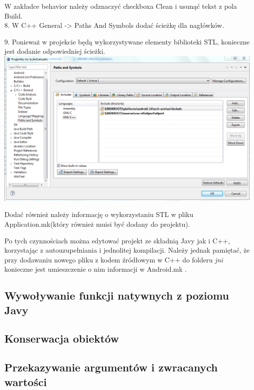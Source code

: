   W zakładce behavior należy odznaczyć checkboxa Clean i usunąć tekst z pola
  Build.\\
  8. W C++ General -> Paths And Symbols dodać ścieżkę dla nagłówków.
 
  9. Ponieważ w projekcie będą wykorzystywane elementy biblioteki STL, konieczne
  jest dodanie odpowiedniej ścieżki.\\
  
  \includegraphics[width=\textwidth]{./img/ndkroot.png}
  
  Dodać również należy informację o wykorzystaniu STL w pliku
  Application.mk(który również muisi być dodany do projektu).
  
  
  
  Po tych czynnościach można edytować projekt ze składnią Javy jak i C++,
  korzystając z autouzupełniania i jednolitej kompilacji. Należy jednak
  pamiętać, że przy dodawaniu nowego pliku z kodem źródłowym w C++ do folderu
  \emph{jni} konieczne jest umieszczenie o nim informacji w Android.mk .

\subsection{Wywoływanie funkcji natywnych z poziomu Javy}

\subsection{Konserwacja obiektów}

\subsection{Przekazywanie argumentów i zwracanych wartości}

